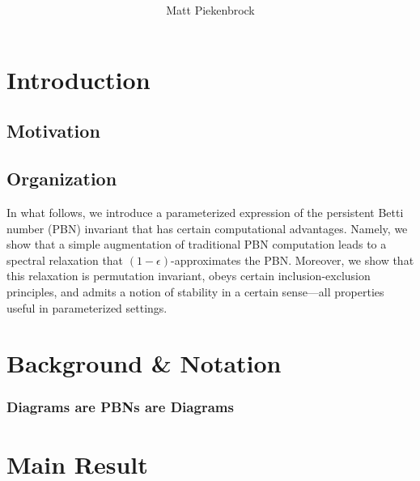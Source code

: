 \documentclass[10pt]{article}
\title{\vspace{-2.0em} \vspace{-0.5em}}
\author{Matt Piekenbrock}
\date{}
\newcommand{\+}{%
	\raisebox{0.18ex}{\scaleobj{0.55}{+}}
}
\begin{document}
\noindent



\section{Introduction}
\subsection*{Motivation}




\subsection{Organization}

In what follows, we introduce a parameterized expression of the persistent Betti number (PBN) invariant that has certain computational advantages. Namely, we show that a simple augmentation of traditional PBN computation leads to a spectral relaxation that $(1-\epsilon)$-approximates the PBN. Moreover, we show that this relaxation is permutation invariant, obeys certain inclusion-exclusion principles, and admits a notion of stability in a certain sense---all properties useful in parameterized settings. 

\section{Background \& Notation}\label{sec:background_notation}
%

\subsubsection*{Diagrams are PBNs are Diagrams}



\section{Main Result}
\end{document}
